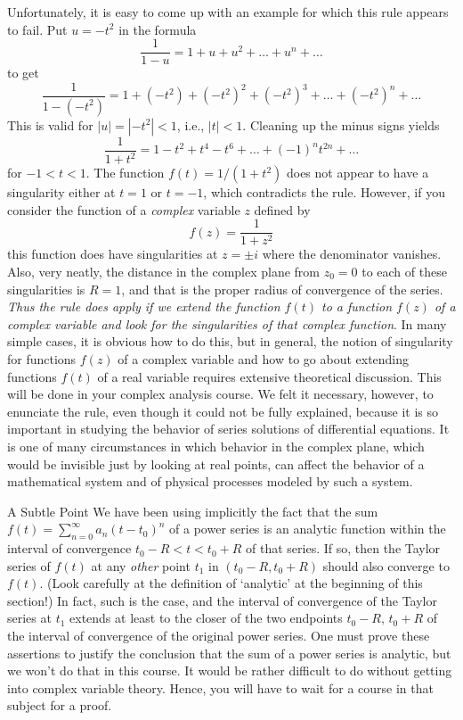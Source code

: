 Unfortunately, it is easy to come up with an example for which
this rule appears to fail.  Put  $u = -t^2$  in
the formula 
$$
\frac 1{1 - u} = 1 + u + u^2 + \dots + u^n + \dots
$$
to get
$$
\frac 1{1 - (-t^2)} = 1 + (-t^2) + (-t^2)^2 + (-t^2)^3
+ \dots + (-t^2)^n + \dots
$$
This is valid for $|u| = |-t^2| < 1$, i.e., $|t| < 1$.
Cleaning up the minus signs yields
$$
\frac 1{1 + t^2} = 1 - t^2 + t^4 - t^6 + \dots + (-1)^nt^{2n} + \dots
$$
for $-1 < t < 1$.    The function $f(t) = 1/(1 + t^2)$ does
not appear to have a singularity either at $t = 1$ or $t= -1$,
which contradicts the rule.  However, if you consider the function
of a {\it complex\/} variable $z$ defined by
$$
f(z) = \frac 1{1 +z^2}
$$
this function does have singularities at $z = \pm i$ where the
denominator vanishes.   Also, very neatly, the distance
in the complex plane from $z_0 = 0$ to each of these singularities
is $R = 1$, and that is the proper radius of convergence of the
series.  {\it Thus the rule does apply if we extend the function
$f(t)$ to a function $f(z)$ of a complex variable and look for
the singularities of that complex function}.   In many simple
cases, it is obvious how to do this, but in general, the
notion of singularity for  functions $f(z)$ of a complex
variable and how to go about extending  functions $f(t)$ of a real
variable requires extensive theoretical discussion.
This will be done in your complex analysis course.  We felt
it necessary, however, to enunciate the rule, even though
it could not be fully explained, because it is so important
in studying the behavior of series solutions of differential
equations.  It is one of many circumstances in  which 
behavior in the complex plane, which would be invisible just
by looking at real points, can affect the behavior of a mathematical
system and of physical processes modeled by such a system.

\subhead A Subtle Point \endsubhead
We have been using implicitly the fact that the sum
 $f(t) = \sum_{n=0}^\infty a_n (t - t_0)^n$ of a power
series is an analytic function within the interval
of convergence $t_0 - R < t < t_0 + R$ of that series.
If so, then the Taylor series of $f(t)$
at any {\it other\/}
point $t_1$ in $(t_0 - R, t_0 + R)$ should also converge to $f(t)$.
(Look carefully at the definition of `analytic' at the beginning
of this section!)
In fact, such is the case, and the interval of convergence 
of the Taylor series at $t_1$
 extends at least to
the closer of the two endpoints  $t_0 - R, \, t_0 + R$ of the
interval of convergence of the original power series.  
One must prove these assertions to justify
the conclusion that the sum of a power series
is analytic, but we won't do that in this course.
It would be rather difficult to do without getting
into complex variable theory.
Hence, you will have to wait for a course in that subject for
a proof.   

